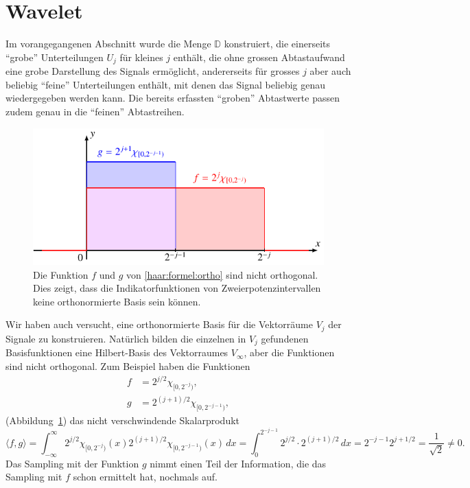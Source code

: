 %
%
%
\section{Wavelet%
\label{section:haar-wavelet}}
Im vorangegangenen Abschnitt wurde die Menge $\mathbb D$ konstruiert, die
einerseits ``grobe'' Unterteilungen $U_j$ für kleines $j$ enthält, die ohne
grossen Abtastaufwand eine grobe Darstellung des Signals ermöglicht,
andererseits für grosses $j$ aber auch beliebig ``feine'' Unterteilungen
enthält, mit denen das Signal beliebig genau wiedergegeben werden kann.
Die bereits erfassten ``groben'' Abtastwerte passen zudem genau in die
``feinen'' Abtastreihen.

\begin{figure}
\centering
\includegraphics{chapters/3-haar/images/ortho.pdf}
\caption{Die Funktion $f$ und $g$ von \eqref{haar:formel:ortho} sind
nicht orthogonal.
Dies zeigt, dass die Indikatorfunktionen von Zweierpotenzintervallen
keine orthonormierte Basis sein können.
\label{haar:figure:ortho}}
\end{figure}
Wir haben auch versucht, eine orthonormierte Basis für die Vektorräume
$V_j$ der Signale zu konstruieren.
Natürlich bilden die einzelnen in $V_j$ gefundenen Basisfunktionen eine 
Hilbert-Basis des Vektorraumes $V_\infty$, aber die Funktionen sind
nicht orthogonal.
Zum Beispiel haben die Funktionen 
\begin{equation}
\begin{aligned}
f&=2^{j/2}\chi_{[0,2^{-j})},
\\
g&=2^{(j+1)/2}\chi_{[0,2^{-j-1})},
\end{aligned}
\label{haar:formel:ortho}
\end{equation}
(Abbildung~\ref{haar:figure:ortho})
das nicht verschwindende Skalarprodukt
\[
\langle f,g\rangle 
=
\int_{-\infty}^\infty
2^{j/2}\chi_{[0,2^{-j})}(x)
2^{(j+1)/2}\chi_{[0,2^{-j-1})}(x)\,dx
=
\int_0^{2^{-j-1}} 2^{j/2}\cdot 2^{(j+1)/2}\,dx
=
2^{-j-1}2^{j + 1/2}
=
\frac{1}{\sqrt{2}}\ne 0.
\]
Das Sampling mit der Funktion $g$ nimmt einen Teil der Information,
die das Sampling mit $f$ schon ermittelt hat, nochmals auf.

